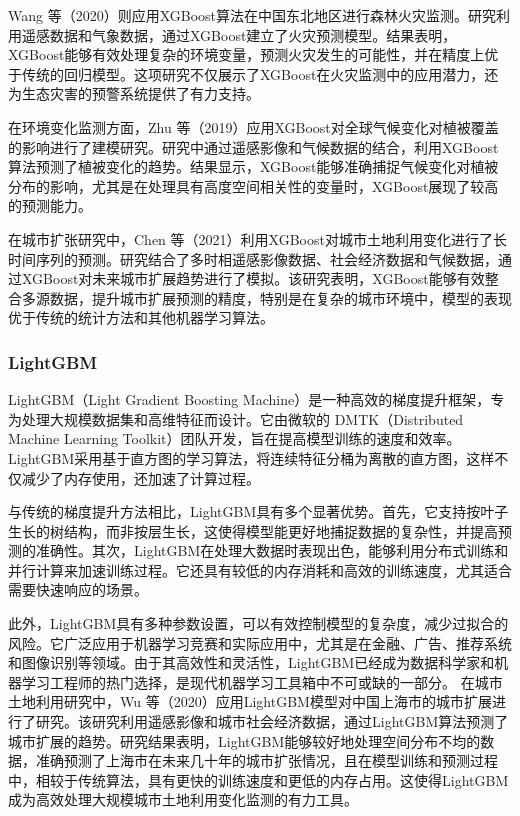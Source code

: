 \documentclass{article}
\begin{document}
	Wang 等（2020）则应用XGBoost算法在中国东北地区进行森林火灾监测。研究利用遥感数据和气象数据，通过XGBoost建立了火灾预测模型。结果表明，XGBoost能够有效处理复杂的环境变量，预测火灾发生的可能性，并在精度上优于传统的回归模型。这项研究不仅展示了XGBoost在火灾监测中的应用潜力，还为生态灾害的预警系统提供了有力支持。
	
	在环境变化监测方面，Zhu 等（2019）应用XGBoost对全球气候变化对植被覆盖的影响进行了建模研究。研究中通过遥感影像和气候数据的结合，利用XGBoost算法预测了植被变化的趋势。结果显示，XGBoost能够准确捕捉气候变化对植被分布的影响，尤其是在处理具有高度空间相关性的变量时，XGBoost展现了较高的预测能力。
	
	在城市扩张研究中，Chen 等（2021）利用XGBoost对城市土地利用变化进行了长时间序列的预测。研究结合了多时相遥感影像数据、社会经济数据和气候数据，通过XGBoost对未来城市扩展趋势进行了模拟。该研究表明，XGBoost能够有效整合多源数据，提升城市扩展预测的精度，特别是在复杂的城市环境中，模型的表现优于传统的统计方法和其他机器学习算法。
	
	\subsubsection{LightGBM}
	LightGBM（Light Gradient Boosting Machine）是一种高效的梯度提升框架，专为处理大规模数据集和高维特征而设计。它由微软的 DMTK（Distributed Machine Learning Toolkit）团队开发，旨在提高模型训练的速度和效率。LightGBM采用基于直方图的学习算法，将连续特征分桶为离散的直方图，这样不仅减少了内存使用，还加速了计算过程。
	
	与传统的梯度提升方法相比，LightGBM具有多个显著优势。首先，它支持按叶子生长的树结构，而非按层生长，这使得模型能更好地捕捉数据的复杂性，并提高预测的准确性。其次，LightGBM在处理大数据时表现出色，能够利用分布式训练和并行计算来加速训练过程。它还具有较低的内存消耗和高效的训练速度，尤其适合需要快速响应的场景。
	
	此外，LightGBM具有多种参数设置，可以有效控制模型的复杂度，减少过拟合的风险。它广泛应用于机器学习竞赛和实际应用中，尤其是在金融、广告、推荐系统和图像识别等领域。由于其高效性和灵活性，LightGBM已经成为数据科学家和机器学习工程师的热门选择，是现代机器学习工具箱中不可或缺的一部分。
	在城市土地利用研究中，Wu 等（2020）应用LightGBM模型对中国上海市的城市扩展进行了研究。该研究利用遥感影像和城市社会经济数据，通过LightGBM算法预测了城市扩展的趋势。研究结果表明，LightGBM能够较好地处理空间分布不均的数据，准确预测了上海市在未来几十年的城市扩张情况，且在模型训练和预测过程中，相较于传统算法，具有更快的训练速度和更低的内存占用。这使得LightGBM成为高效处理大规模城市土地利用变化监测的有力工具。
	
\end{document}
